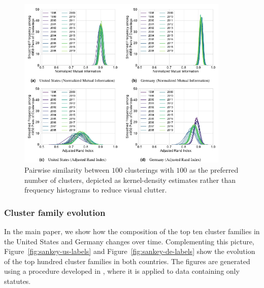 \documentclass[utf8,sort&compress,numbers,square,table,hidelinks]{frontiers_suppmat} %
\begin{document}
\begin{figure}
	\center
	\includegraphics[width=0.9\textwidth]{figure_si_variance_infomap.pdf}
			\caption{Pairwise similarity between $100$ clusterings with $100$ as the preferred number of clusters, depicted as kernel-density estimates rather than frequency histograms to reduce visual clutter.}
	\label{fig:consensus-within}
\end{figure}

\vspace*{12pt}
\subsubsection{Cluster family evolution}

In the main paper, we show how the composition of the top ten cluster families in the United States and Germany changes over time. 
Complementing this picture, Figure~\ref{fig:sankey-us-labels} and Figure~\ref{fig:sankey-de-labels} show the evolution of the top hundred cluster families in both countries.
The figures are generated using a procedure developed in \cite{katz2020}, where it is applied to data containing only statutes.
\end{document}
